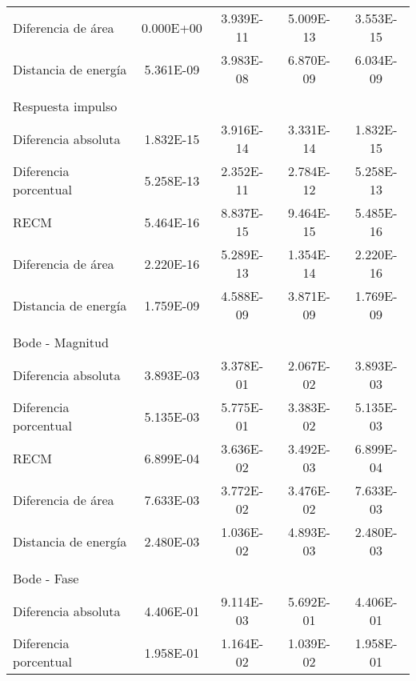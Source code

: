 {\begin{longtable}{l @{\extracolsep{\fill}} cccc}
            Diferencia de área     & \num{0.000E+00} & \num{3.939E-11} & \num{5.009E-13} & \num{3.553E-15}  \\
            Distancia de energía   & \num{5.361E-09} & \num{3.983E-08} & \num{6.870E-09} & \num{6.034E-09}  \\
            & & & & \\
            Respuesta impulso      & & & & \\ \cmidrule{1-1}
            Diferencia absoluta    & \num{1.832E-15} & \num{3.916E-14} & \num{3.331E-14} & \num{1.832E-15}  \\
            Diferencia porcentual  & \num{5.258E-13} & \num{2.352E-11} & \num{2.784E-12} & \num{5.258E-13}  \\
            RECM                   & \num{5.464E-16} & \num{8.837E-15} & \num{9.464E-15} & \num{5.485E-16}  \\
            Diferencia de área     & \num{2.220E-16} & \num{5.289E-13} & \num{1.354E-14} & \num{2.220E-16}  \\
            Distancia de energía   & \num{1.759E-09} & \num{4.588E-09} & \num{3.871E-09} & \num{1.769E-09}  \\
            & & & & \\
            Bode - Magnitud        & & & & \\ \cmidrule{1-1}
            Diferencia absoluta    & \num{3.893E-03} & \num{3.378E-01} & \num{2.067E-02} & \num{3.893E-03}  \\
            Diferencia porcentual  & \num{5.135E-03} & \num{5.775E-01} & \num{3.383E-02} & \num{5.135E-03}  \\
            RECM                   & \num{6.899E-04} & \num{3.636E-02} & \num{3.492E-03} & \num{6.899E-04}  \\
            Diferencia de área     & \num{7.633E-03} & \num{3.772E-02} & \num{3.476E-02} & \num{7.633E-03}  \\
            Distancia de energía   & \num{2.480E-03} & \num{1.036E-02} & \num{4.893E-03} & \num{2.480E-03}  \\
            & & & & \\
            Bode - Fase            & & & & \\ \cmidrule{1-1}
            Diferencia absoluta    & \num{4.406E-01} & \num{9.114E-03} & \num{5.692E-01} & \num{4.406E-01}  \\
            Diferencia porcentual  & \num{1.958E-01} & \num{1.164E-02} & \num{1.039E-02} & \num{1.958E-01}  \\

\end{longtable}}
